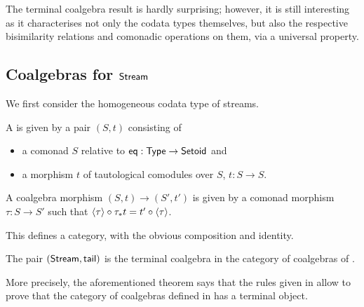 \documentclass[envcountsame]{llncs}
\begin{document}
The terminal coalgebra result is hardly surprising; however, it is still interesting as it characterises not only the codata types themselves,
 but also the respective bisimilarity relations and comonadic operations on them, via a universal property.
 



\begin{Long}
\subsection{Coalgebras for $\mathsf{Stream}$}

We first consider the homogeneous codata type of streams.
\end{Long}

\begin{definition}%
 \label{cat_stream}
  A  is given by a pair $(S,t)$ 
  consisting of
  \begin{itemize}
   \item a comonad $S$ relative to $\mathsf{eq} : \mathsf{Type} \to \mathsf{Setoid}$ and
   \item a morphism $t$ of tautological comodules over $S$, $t : S \to S$.
  \end{itemize}
  A coalgebra morphism $(S,t) \to (S',t')$ is given by a comonad morphism $\tau : S \to S'$ such that
     $ {\langle {\tau} \rangle} \circ {\tau_*t} = {t'} \circ {\ensuremath{\langle {\tau} \rangle}}$.
\end{definition}

This defines a category, with the obvious composition and identity. 

\begin{theorem}\label{thm_stream_terminal}
 The pair $(\mathsf{Stream}, \mathsf{tail})$ is the terminal coalgebra in the category of coalgebras of .
\end{theorem}

More precisely, the aforementioned theorem says that the rules given in  allow to prove that
the category of coalgebras defined in  has a terminal object.
\end{document}
